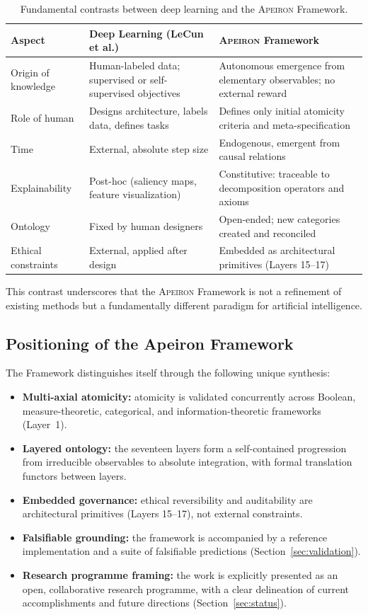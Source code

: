 \begin{table}[htbp]
\centering
\caption{Fundamental contrasts between deep learning and the \textsc{Apeiron} Framework.}
\label{tab:contrast}
\begin{tabular}{p{} p{} p{}}
\toprule
\textbf{Aspect} & \textbf{Deep Learning (LeCun et al.)} & \textbf{\textsc{Apeiron} Framework} \\
\midrule
Origin of knowledge & Human-labeled data; supervised or self-supervised objectives & Autonomous emergence from elementary observables; no external reward \\
Role of human & Designs architecture, labels data, defines tasks & Defines only initial atomicity criteria and meta-specification \\
Time & External, absolute step size & Endogenous, emergent from causal relations \\
Explainability & Post-hoc (saliency maps, feature visualization) & Constitutive: traceable to decomposition operators and axioms \\
Ontology & Fixed by human designers & Open-ended; new categories created and reconciled \\
Ethical constraints & External, applied after design & Embedded as architectural primitives (Layers 15--17) \\
\bottomrule
\end{tabular}
\end{table}

This contrast underscores that the \textsc{Apeiron} Framework is not a refinement of existing methods but a fundamentally different paradigm for artificial intelligence.

\subsection{Positioning of the Apeiron Framework}
The \Apeiron{} Framework distinguishes itself through the following unique synthesis:
\begin{itemize}
    \item \textbf{Multi-axial atomicity:} atomicity is validated concurrently across Boolean, measure-theoretic, categorical, and information-theoretic frameworks (Layer~1).
    \item \textbf{Layered ontology:} the seventeen layers form a self-contained progression from irreducible observables to absolute integration, with formal translation functors between layers.
    \item \textbf{Embedded governance:} ethical reversibility and auditability are architectural primitives (Layers 15--17), not external constraints.
    \item \textbf{Falsifiable grounding:} the framework is accompanied by a reference implementation and a suite of falsifiable predictions (Section~\ref{sec:validation}).
    \item \textbf{Research programme framing:} the work is explicitly presented as an open, collaborative research programme, with a clear delineation of current accomplishments and future directions (Section~\ref{sec:status}).
\end{itemize}